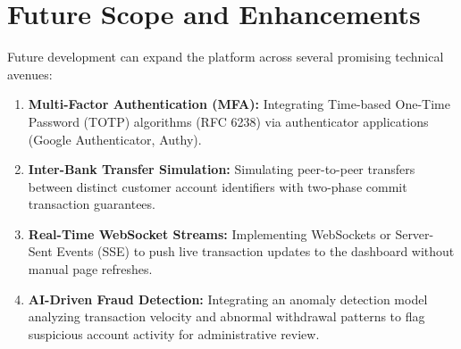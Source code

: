 \section{Future Scope and Enhancements}
Future development can expand the platform across several promising technical avenues:
\begin{enumerate}
    \item \textbf{Multi-Factor Authentication (MFA):} Integrating Time-based One-Time Password (TOTP) algorithms (RFC 6238) via authenticator applications (Google Authenticator, Authy).
    \item \textbf{Inter-Bank Transfer Simulation:} Simulating peer-to-peer transfers between distinct customer account identifiers with two-phase commit transaction guarantees.
    \item \textbf{Real-Time WebSocket Streams:} Implementing WebSockets or Server-Sent Events (SSE) to push live transaction updates to the dashboard without manual page refreshes.
    \item \textbf{AI-Driven Fraud Detection:} Integrating an anomaly detection model analyzing transaction velocity and abnormal withdrawal patterns to flag suspicious account activity for administrative review.
\end{enumerate}
